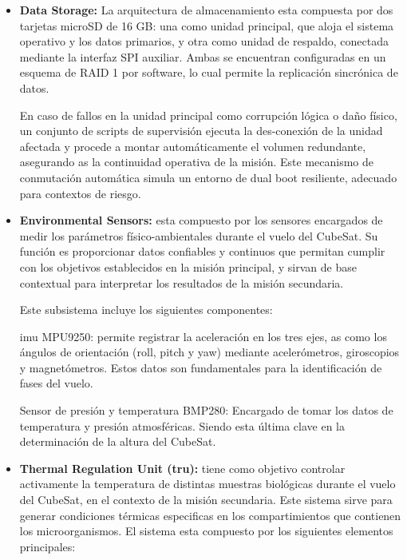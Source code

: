 \begin{itemize}
      \item \textbf{Data Storage:} La arquitectura de almacenamiento esta compuesta por dos tarjetas
        microSD de 16 GB: una como unidad principal, que aloja el sistema operativo y los
        datos primarios, y otra como unidad de respaldo, conectada mediante la interfaz SPI
        auxiliar. Ambas se encuentran configuradas en un esquema de RAID 1 por software,
        lo cual permite la replicación sincrónica de datos.

        En caso de fallos en la unidad principal
        como corrupción lógica o daño físico, un conjunto de scripts de supervisión ejecuta
        la des-conexión de la unidad afectada y procede a montar automáticamente el volumen
        redundante, asegurando as la continuidad operativa de la misión. Este mecanismo de
        conmutación automática simula un entorno de dual boot resiliente, adecuado para
        contextos de riesgo.

      \item \textbf{Environmental Sensors:} esta compuesto por los sensores encargados de medir los
        parámetros físico-ambientales durante el vuelo del CubeSat. Su función es proporcionar
        datos confiables y continuos que permitan cumplir con los objetivos establecidos en la
        misión principal, y sirvan de base contextual para interpretar los resultados de la misión
        secundaria.

        Este subsistema incluye los siguientes componentes:

        \acrfull{imu} MPU9250: permite registrar la aceleración en los
        tres ejes, as como los ángulos de orientación (roll, pitch y yaw) mediante acelerómetros,
        giroscopios y magnetómetros. Estos datos son fundamentales para la identificación de fases
        del vuelo.

        Sensor de presión y temperatura BMP280: Encargado de tomar los datos de temperatura y presión
        atmosféricas. Siendo esta última clave en la determinación de la altura del CubeSat.

      \item \textbf{Thermal Regulation Unit (\acrshort{tru}):} tiene como objetivo controlar activamente la
        temperatura de distintas muestras biológicas durante el vuelo del CubeSat, en el contexto de la
        misión secundaria. Este sistema sirve para generar condiciones térmicas
        especificas en los compartimientos que contienen los microorganismos.
        El sistema esta compuesto por los siguientes elementos principales:


\end{itemize}
